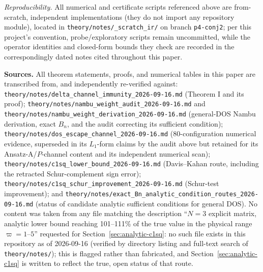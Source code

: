 \documentclass[11pt]{article}
\begin{document}
\medskip
\noindent\textit{Reproducibility.} All numerical and certificate scripts
referenced above are from-scratch, independent implementations (they do not
import any repository module), located in
\texttt{theory/notes/\_scratch\_ir/} on branch \texttt{p4-conj2}; per this
project's convention, probe/exploratory scripts remain uncommitted, while
the operator identities and closed-form bounds they check are recorded in
the correspondingly dated notes cited throughout this paper.

\bigskip
\noindent\textbf{Sources.} All theorem statements, proofs, and numerical
tables in this paper are transcribed from, and independently re-verified
against: \texttt{theory/notes/delta\_channel\_immunity\_2026-09-16.md}
(Theorem I and its proof); \texttt{theory/notes/nambu\_weight\_audit\_2026-09-16.md}
and \texttt{theory/notes/nambu\_weight\_derivation\_2026-09-16.md} (general-DOS
Nambu derivation, exact $B_n$, and the audit correcting its sufficient
condition); \texttt{theory/notes/dos\_escape\_channel\_2026-09-16.md}
(80-configuration numerical evidence, superseded in its $L_1$-form claims by
the audit above but retained for its Ansatz-A/$P$-channel content and its
independent numerical scan); \texttt{theory/notes/c1sq\_lower\_bound\_2026-09-16.md}
(Davis--Kahan route, including the retracted Schur-complement sign error);
\texttt{theory/notes/c1sq\_schur\_improvement\_2026-09-16.md} (Schur-test
improvement); and \texttt{theory/notes/exact\_Bn\_analytic\_condition\_routes\_2026-09-16.md}
(status of candidate analytic sufficient conditions for general DOS). No
content was taken from any file matching the description ``$N=3$ explicit
matrix, analytic lower bound reaching 101--111\% of the true value in the
physical range $\varpi=1$--$5$'' requested for Section~\ref{sec:analytic-c1sq}:
no such file exists in this repository as of 2026-09-16 (verified by
directory listing and full-text search of \texttt{theory/notes/}); this is
flagged rather than fabricated, and Section~\ref{sec:analytic-c1sq} is
written to reflect the true, open status of that route.
\end{document}
